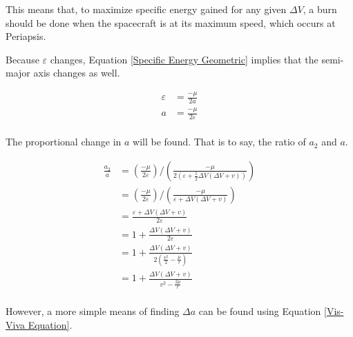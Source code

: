 \documentclass{article}
\begin{document}
This means that, to maximize specific energy gained for any given $\Delta V$, a burn should be done when the spacecraft is at its maximum speed, which occurs at Periapsis.

Because $\varepsilon$ changes, Equation \eqref{Specific Energy Geometric} implies that the semi-major axis changes as well.

\begin{align*}
    \varepsilon & = \frac{-\mu}{2a}           \\
    a           & = \frac{-\mu}{2\varepsilon} \\
\end{align*}

The proportional change in $a$ will be found. That is to say, the ratio of $a_2$ and $a$.

\begin{align*}
    \frac{a_2}{a} & = (\frac{-\mu}{2\varepsilon})/(\frac{-\mu}{2(\varepsilon+\frac{1}{2}\Delta V\left(\Delta V+v\right))})         \\
                  & = \left(\frac{-\mu}{2\varepsilon}\right)/\left(\frac{-\mu}{\varepsilon+\Delta V\left(\Delta V+v\right)}\right) \\
                  & = \frac{\varepsilon+\Delta V\left(\Delta V+v\right)}{2\varepsilon}                                             \\
                  & = 1+\frac{\Delta V\left(\Delta V+v\right)}{2\varepsilon}                                                       \\
                  & = 1+\frac{\Delta V\left(\Delta V+v\right)}{2\left(\frac{v^2}{2}-\frac{\mu{}}{r}\right)}                        \\
                  & = 1+\frac{\Delta V\left(\Delta V+v\right)}{v^2-\frac{2\mu{}}{r}}                                               \\
\end{align*}

However, a more simple means of finding $\Delta a$ can be found using Equation \eqref{Vis-Viva Equation}.
\end{document}
